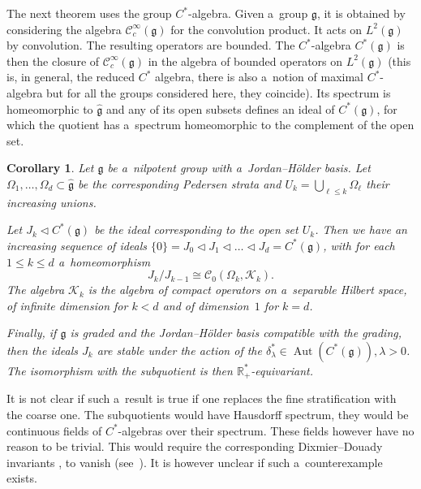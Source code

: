 \documentclass[pdftex]{sigma}
\newcommand{\R}{\mathbb R} %
\newcommand{\Z}{\mathbb Z} %
\newcommand{\CCC}{\mathscr{C}} %
\newcommand{\g}{\mathfrak{g}} %
\numberwithin{equation}{section}
\newtheorem{cor}[thm]{Corollary}
\theoremstyle{definition}
\begin{document}
The next theorem uses the group $C^*$-algebra. Given a~group $\g$, it is obtained by considering the algebra $\CCC^{\infty}_c(\g)$ for the convolution product. It acts on $L^2(\g)$ by convolution. The resulting operators are bounded. The $C^*$-algebra $C^*(\g)$ is then the closure of $\CCC^{\infty}_c(\g)$ in the algebra of bounded operators on $L^2(\g)$ (this is, in general, the reduced $C^*$ algebra, there is also a~notion of maximal $C^*$-algebra but for all the groups considered here, they coincide). Its spectrum is homeomorphic to $\widehat{\g}$ and any of its open subsets defines an ideal of $C^*(\g)$, for which the quotient has a~spectrum homeomorphic to the complement of the open set.

\begin{cor}\label{Cor: Solvability group}
 Let $\g$ be a~nilpotent group with a~Jordan--H\"older basis. Let $\Omega_1,\dots,\Omega_d \subset \widehat{\g}$ be the corresponding Pedersen strata and $U_k = \bigcup_{\ell \leq k} \Omega_{\ell}$ their increasing unions.

 Let $J_k \triangleleft C^*(\g)$ be the ideal corresponding to the open set $U_k$. Then we have an increasing sequence of ideals $\{0\} = J_0 \triangleleft J_1 \triangleleft \dots\triangleleft J_d = C^*(\g)$,
 with for each $1\leq k \leq d$ a~homeomorphism
 \[{J_k}/{J_{k-1}} \cong \CCC_0(\Omega_k,\mathcal{K}_k).\]
 The algebra $\mathcal{K}_k$ is the algebra of compact operators on a~separable Hilbert space, of infinite dimension for $k<d$ and of dimension~$1$ for $k = d$.

 Finally, if $\g$ is graded and the Jordan--H\"older basis compatible with the grading, then the ideals $J_k$ are stable under the action of the $\delta_{\lambda}^* \in \operatorname{Aut}(C^*(\g)), \lambda > 0$. The isomorphism with the subquotient is then $\R^*_+$-equivariant.
\end{cor}

It is not clear if such a~result is true if one replaces the fine stratification with the coarse one. The subquotients would have Hausdorff spectrum, they would be continuous fields of $C^*$-algebras over their spectrum. These fields however have no reason to be trivial. This would require the corresponding Dixmier--Douady invariants
\smash{$\delta_{DD}({J_i}/{J_{i-1}}) \in H^3(\Omega_i;\Z)$},
to vanish (see~\cite{DixmierDouady}). It is however unclear if such a~counterexample exists.
\end{document}
